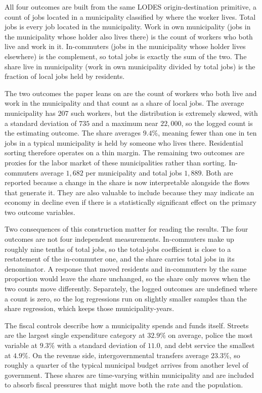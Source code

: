 \documentclass[12pt]{article}
\begin{document}
All four outcomes are built from the same LODES origin-destination
primitive, a count of jobs located in a municipality classified by where
the worker lives. Total jobs is every job located in the municipality.
Work in own municipality (jobs in the municipality whose holder also
lives there) is the count of workers who both live and work in it.
In-commuters (jobs in the municipality whose holder lives elsewhere) is
the complement, so total jobs is exactly the sum of the two. The share
live in municipality (work in own municipality divided by total jobs) is
the fraction of local jobs held by residents.

The two outcomes the paper leans on are the count of workers who both
live and work in the municipality and that count as a share of local
jobs. The average municipality has $207$ such workers, but the
distribution is extremely skewed, with a standard deviation of $735$ and
a maximum near $22{,}000$, so the logged count is the estimating
outcome. The share averages $9.4\%$, meaning fewer than one in ten jobs
in a typical municipality is held by someone who lives there. Residential
sorting therefore operates on a thin margin. The remaining two outcomes are proxies for the labor market of these municipalities rather
than sorting. In-commuters average $1{,}682$ per municipality
and total jobs $1{,}889$. Both are reported because a change in the share is now
interpretable alongside the flows that generate it. They are also valuable to include because they may indicate an economy in decline even if there is a statistically significant effect on the primary two outcome variables.

Two consequences of this construction matter for reading the results.
The four outcomes are not four independent measurements. In-commuters
make up roughly nine tenths of total jobs, so the total-jobs coefficient
is close to a restatement of the in-commuter one, and the share carries
total jobs in its denominator. A response that moved residents and
in-commuters by the same proportion would leave the share unchanged, so
the share only moves when the two counts move differently. Separately,
the logged outcomes are undefined where a count is zero, so the log
regressions run on slightly smaller samples than the share regression,
which keeps those municipality-years.

The fiscal controls describe how a municipality spends and funds
itself. Streets are the largest single expenditure category at $32.9\%$
on average, police the most variable at $9.3\%$ with a standard
deviation of $11.0$, and debt service the smallest at $4.9\%$.
On the revenue side, intergovernmental transfers average $23.3\%$, so
roughly a quarter of the typical municipal budget arrives from another
level of government. These shares are time-varying within municipality
and are included to absorb fiscal pressures that might move both the
rate and the population.
\end{document}
